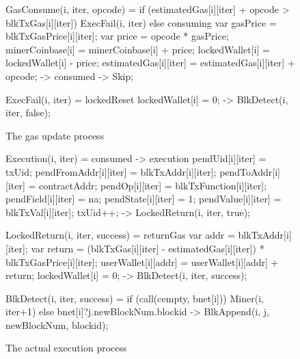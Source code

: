 \documentclass{KERauth}
\begin{document}
\begin{figure}[t]
\begin{center}
\begin{boxedverbatim}
GasConsume(i, iter, opcode) =
  if (estimatedGas[i][iter] + opcode > blkTxGas[i][iter]) {
		ExecFail(i, iter)}
  else {
    consuming{
      var gasPrice = blkTxGasPrice[i][iter];
      var price = opcode * gasPrice;
      minerCoinbase[i] = minerCoinbase[i] + price;
      lockedWallet[i] = lockedWallet[i] - price;
      estimatedGas[i][iter] = estimatedGas[i][iter] + opcode;} -> 
      consumed -> 
      Skip};

ExecFail(i, iter) =
  lockedReset{ lockedWallet[i] = 0;} -> 
  BlkDetect(i, iter, false);
\end{boxedverbatim}
\end{center}
\caption{The gas update process}\label{fig:gas}
\end{figure}




\begin{figure}[!h]
\begin{center}
\begin{boxedverbatim}
Execution(i, iter) = consumed ->
                     execution{
                       pendUid[i][iter] = txUid;
                       pendFromAddr[i][iter] = blkTxAddr[i][iter];
                       pendToAddr[i][iter] = contractAddr;
                       pendOp[i][iter] = blkTxFunction[i][iter];
                       pendField[i][iter] = na;
                       pendState[i][iter] = 1;
                       pendValue[i][iter] = blkTxVal[i][iter];
                       txUid++;} -> 
                     LockedReturn(i, iter, true);

LockedReturn(i, iter, success) = 
  returnGas{
    var addr = blkTxAddr[i][iter];
    var return = (blkTxGas[i][iter] - estimatedGas[i][iter]) * blkTxGasPrice[i][iter];
    userWallet[i][addr] = userWallet[i][addr] + return;
    lockedWallet[i] = 0; } ->
  BlkDetect(i, iter, success);

BlkDetect(i, iter, success) = 
  if (call(cempty, bnet[i])) {Miner(i, iter+1)} 
  else {bnet[i]?j.newBlockNum.blockid -> BlkAppend(i, j, newBlockNum, blockid)};
\end{boxedverbatim}
\end{center}
\caption{The actual execution process}\label{fig:execution}
\end{figure}
\end{document}
